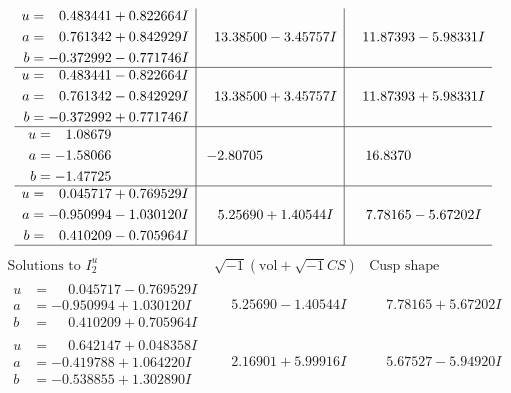 \documentclass[1p]{elsarticle_modified}
\theoremstyle{definition}
\newcommand{\I}{\sqrt{-1}}
\begin{document}
$$\begin{array}{c|c|c}
\begin{aligned}
u &= \phantom{-}0.483441 + 0.822664 I \\
a &= \phantom{-}0.761342 + 0.842929 I \\
b &= -0.372992 - 0.771746 I\end{aligned}
 & \phantom{-}13.38500 - 3.45757 I & \phantom{-}11.87393 - 5.98331 I \\ \hline\begin{aligned}
u &= \phantom{-}0.483441 - 0.822664 I \\
a &= \phantom{-}0.761342 - 0.842929 I \\
b &= -0.372992 + 0.771746 I\end{aligned}
 & \phantom{-}13.38500 + 3.45757 I & \phantom{-}11.87393 + 5.98331 I \\ \hline\begin{aligned}
u &= \phantom{-}1.08679\phantom{ +0.000000I} \\
a &= -1.58066\phantom{ +0.000000I} \\
b &= -1.47725\phantom{ +0.000000I}\end{aligned}
 & -2.80705\phantom{ +0.000000I} & \phantom{-}16.8370\phantom{ +0.000000I} \\ \hline\begin{aligned}
u &= \phantom{-}0.045717 + 0.769529 I \\
a &= -0.950994 - 1.030120 I \\
b &= \phantom{-}0.410209 - 0.705964 I\end{aligned}
 & \phantom{-}5.25690 + 1.40544 I & \phantom{-}7.78165 - 5.67202 I\\
 \hline 
 \end{array}$$\newpage$$\begin{array}{c|c|c}  
\text{Solutions to }I^u_{2}& \I (\text{vol} + \sqrt{-1}CS) & \text{Cusp shape}\\
 \hline 
\begin{aligned}
u &= \phantom{-}0.045717 - 0.769529 I \\
a &= -0.950994 + 1.030120 I \\
b &= \phantom{-}0.410209 + 0.705964 I\end{aligned}
 & \phantom{-}5.25690 - 1.40544 I & \phantom{-}7.78165 + 5.67202 I \\ \hline\begin{aligned}
u &= \phantom{-}0.642147 + 0.048358 I \\
a &= -0.419788 + 1.064220 I \\
b &= -0.538855 + 1.302890 I\end{aligned}
 & \phantom{-}2.16901 + 5.99916 I & \phantom{-}5.67527 - 5.94920 I \\ \hline\begin{aligned}

\end{aligned}
\end{array}$$
\end{document}
